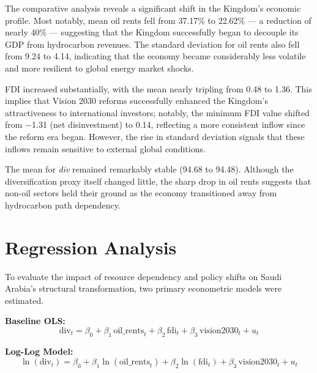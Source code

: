 \documentclass[12pt, a4paper]{article}
\begin{document}
The comparative analysis reveals a significant shift in the Kingdom's economic profile. Most notably, mean oil rents fell from 37.17\% to 22.62\% --- a reduction of nearly 40\% --- suggesting that the Kingdom successfully began to decouple its GDP from hydrocarbon revenues. The standard deviation for oil rents also fell from 9.24 to 4.14, indicating that the economy became considerably less volatile and more resilient to global energy market shocks.

FDI increased substantially, with the mean nearly tripling from 0.48 to 1.36. This implies that Vision 2030 reforms successfully enhanced the Kingdom's attractiveness to international investors; notably, the minimum FDI value shifted from $-$1.31 (net disinvestment) to 0.14, reflecting a more consistent inflow since the reform era began. However, the rise in standard deviation signals that these inflows remain sensitive to external global conditions.

The mean for \textit{div} remained remarkably stable (94.68 to 94.48). Although the diversification proxy itself changed little, the sharp drop in oil rents suggests that non-oil sectors held their ground as the economy transitioned away from hydrocarbon path dependency.

\section{Regression Analysis}

To evaluate the impact of resource dependency and policy shifts on Saudi Arabia's structural transformation, two primary econometric models were estimated.

\noindent\textbf{Baseline OLS:}
\begin{equation}
    \text{div}_t = \beta_0 + \beta_1\,\text{oil\_rents}_t + \beta_2\,\text{fdi}_t + \beta_3\,\text{vision2030}_t + u_t
\end{equation}

\noindent\textbf{Log-Log Model:}
\begin{equation}
    \ln(\text{div}_t) = \beta_0 + \beta_1\ln(\text{oil\_rents}_t) + \beta_2\ln(\text{fdi}_t) + \beta_3\,\text{vision2030}_t + u_t
\end{equation}
\end{document}
